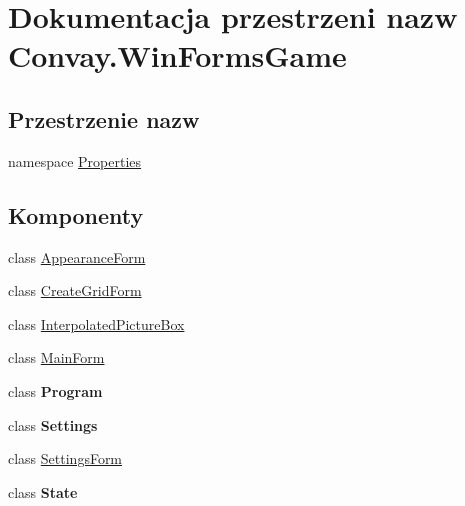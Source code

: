 \hypertarget{namespace_convay_1_1_win_forms_game}{}\section{Dokumentacja przestrzeni nazw Convay.\+Win\+Forms\+Game}
\label{namespace_convay_1_1_win_forms_game}
\subsection*{Przestrzenie nazw}
\begin{DoxyCompactItemize}
\item 
namespace \hyperlink{namespace_convay_1_1_win_forms_game_1_1_properties}{Properties}
\end{DoxyCompactItemize}
\subsection*{Komponenty}
\begin{DoxyCompactItemize}
\item 
class \hyperlink{class_convay_1_1_win_forms_game_1_1_appearance_form}{Appearance\+Form}
\item 
class \hyperlink{class_convay_1_1_win_forms_game_1_1_create_grid_form}{Create\+Grid\+Form}
\item 
class \hyperlink{class_convay_1_1_win_forms_game_1_1_interpolated_picture_box}{Interpolated\+Picture\+Box}
\item 
class \hyperlink{class_convay_1_1_win_forms_game_1_1_main_form}{Main\+Form}
\item 
class {\bfseries Program}
\item 
class {\bfseries Settings}
\item 
class \hyperlink{class_convay_1_1_win_forms_game_1_1_settings_form}{Settings\+Form}
\item 
class {\bfseries State}
\end{DoxyCompactItemize}
